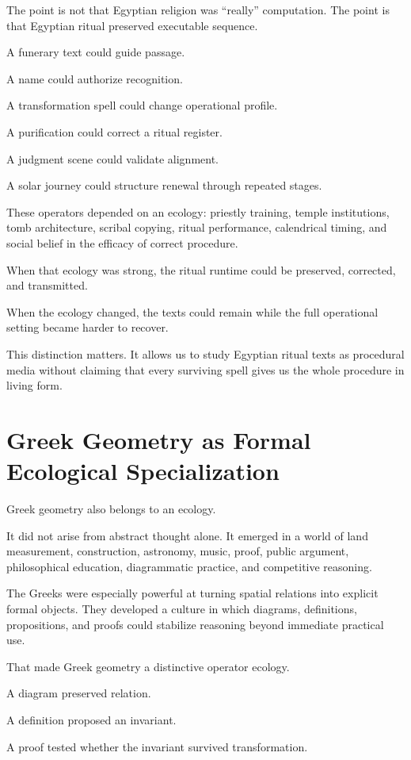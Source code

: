 \documentclass[11pt]{book}
\begin{document}
The point is not that Egyptian religion was ``really'' computation. The point is that Egyptian ritual preserved executable sequence.

A funerary text could guide passage.

A name could authorize recognition.

A transformation spell could change operational profile.

A purification could correct a ritual register.

A judgment scene could validate alignment.

A solar journey could structure renewal through repeated stages.

These operators depended on an ecology: priestly training, temple institutions, tomb architecture, scribal copying, ritual performance, calendrical timing, and social belief in the efficacy of correct procedure.

When that ecology was strong, the ritual runtime could be preserved, corrected, and transmitted.

When the ecology changed, the texts could remain while the full operational setting became harder to recover.

This distinction matters. It allows us to study Egyptian ritual texts as procedural media without claiming that every surviving spell gives us the whole procedure in living form.

\section{Greek Geometry as Formal Ecological Specialization}

Greek geometry also belongs to an ecology.

It did not arise from abstract thought alone. It emerged in a world of land measurement, construction, astronomy, music, proof, public argument, philosophical education, diagrammatic practice, and competitive reasoning.

The Greeks were especially powerful at turning spatial relations into explicit formal objects. They developed a culture in which diagrams, definitions, propositions, and proofs could stabilize reasoning beyond immediate practical use.

That made Greek geometry a distinctive operator ecology.

A diagram preserved relation.

A definition proposed an invariant.

A proof tested whether the invariant survived transformation.
\end{document}
